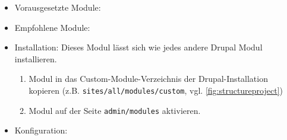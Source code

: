 \begin{itemize}[parsep=0pt, itemsep=5.0pt plus 2.0pt minus 1.0pt, leftmargin=*]
	\item Vorausgesetzte Module:
	
	\item Empfohlene Module:
	
	\item Installation: Dieses Modul lässt sich wie jedes andere Drupal Modul installieren.
	\begin{enumerate}
		\item Modul in das Custom-Module-Verzeichnis der Drupal-Installation kopieren  (z.B. \lstinline|sites/all/modules/custom|, vgl. \cref{fig:structureproject})
		\item Modul auf der Seite \lstinline|admin/modules| aktivieren.
	\end{enumerate}
	
	\item Konfiguration:
	
\end{itemize}



\newpage
